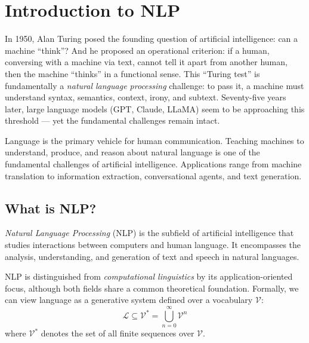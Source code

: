 \chapter{Introduction to NLP}
\label{ch:introduction}

In 1950, Alan Turing posed the founding question of artificial intelligence:
can a machine ``think''? And he proposed an operational criterion: if a
human, conversing with a machine via text, cannot tell it apart from another
human, then the machine ``thinks'' in a functional sense. This ``Turing
test'' is fundamentally a \emph{natural language processing} challenge: to
pass it, a machine must understand syntax, semantics, context, irony, and
subtext. Seventy-five years later, large language models (GPT, Claude, LLaMA)
seem to be approaching this threshold --- yet the fundamental challenges
remain intact.

\begin{intuition}[title=\textbf{Why study NLP?}]
Language is the primary vehicle for human communication. Teaching machines to
understand, produce, and reason about natural language is one of the fundamental
challenges of artificial intelligence. Applications range from machine
translation to information extraction, conversational agents, and text
generation.
\end{intuition}

\section{What is NLP?}
\label{sec:intro:what}

\begin{definition}
\emph{Natural Language Processing} (NLP) is the subfield of artificial
intelligence that studies interactions between computers and human language. It
encompasses the analysis, understanding, and generation of text and speech in
natural languages.
\end{definition}

NLP is distinguished from \emph{computational linguistics} by its
application-oriented focus, although both fields share a common theoretical
foundation. Formally, we can view language as a generative system defined over
a vocabulary $\mathcal{V}$:
\[
\mathcal{L} \subseteq \mathcal{V}^* = \bigcup_{n=0}^{\infty} \mathcal{V}^n
\]
where $\mathcal{V}^*$ denotes the set of all finite sequences over $\mathcal{V}$.

